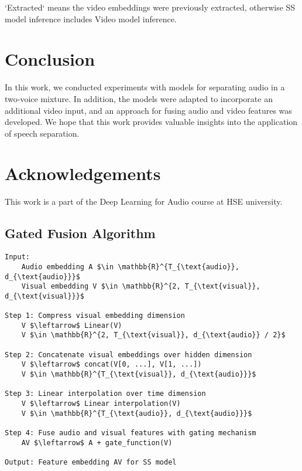 \documentclass[10pt,conference,compsocconf]{IEEEtran}
\begin{document}
`Extracted` means the video embeddings were previously extracted, otherwise SS model inference includes Video model inference.

\section{Conclusion}\label{sec:conclusion}
In this work, we conducted experiments with models for separating audio in a two-voice mixture. In addition, the models were adapted to incorporate an additional video input, and an approach for fusing audio and video features was developed. We hope that this work provides valuable insights into the application of speech separation.

\section{Acknowledgements}\label{sec:acknowledgements}
This work is a part of the Deep Learning for Audio course at HSE university. 





\onecolumn
\appendix


\subsection{Gated Fusion Algorithm}\label{sec:fusion}
\begin{lstlisting}[mathescape=true]
Input:
    Audio embedding A $\in \mathbb{R}^{T_{\text{audio}}, d_{\text{audio}}}$
    Visual embedding V $\in \mathbb{R}^{2, T_{\text{visual}}, d_{\text{visual}}}$

Step 1: Compress visual embedding dimension
    V $\leftarrow$ Linear(V)
    V $\in \mathbb{R}^{2, T_{\text{visual}}, d_{\text{audio}} / 2}$

Step 2: Concatenate visual embeddings over hidden dimension
    V $\leftarrow$ concat(V[0, ...], V[1, ...])
    V $\in \mathbb{R}^{T_{\text{visual}}, d_{\text{audio}}}$
 
Step 3: Linear interpolation over time dimension
    V $\leftarrow$ Linear interpolation(V)
    V $\in \mathbb{R}^{T_{\text{audio}}, d_{\text{audio}}}$

Step 4: Fuse audio and visual features with gating mechanism
    AV $\leftarrow$ A + gate_function(V)

Output: Feature embedding AV for SS model
\end{lstlisting}
\end{document}
